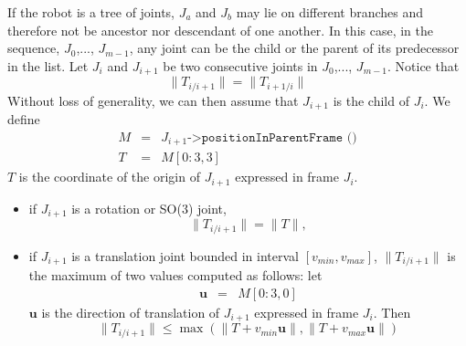 \documentclass {article}
\begin{document}
If the robot is a tree of joints, $J_a$ and $J_b$ may lie on different branches
and therefore not be ancestor nor descendant of one another. In this case, in the sequence, $J_0$,..., $J_{m-1}$, any joint can be the child or the parent of its
predecessor in the list. Let $J_i$ and $J_{i+1}$ be two consecutive joints in $J_0$,..., $J_{m-1}$. Notice that
$$
\|T_{i/i+1}\| = \|T_{i+1/i}\|
$$
Without loss of generality, we can then assume that $J_{i+1}$ is the child of $J_i$. We define
\begin{eqnarray*}
M &=& J_{i+1}\texttt{->positionInParentFrame ()} \\
T &=& M [0:3, 3]
\end{eqnarray*}
$T$ is the coordinate of the origin of $J_{i+1}$ expressed in frame $J_{i}$.
\begin{itemize}
\item if $J_{i+1}$ is a rotation or SO(3) joint,
$$\|T_{i/i+1}\| = \|T\|,$$
\item if $J_{i+1}$ is a translation joint bounded in interval $[v_{min}, v_{max}]$,
$\|T_{i/i+1}\|$ is the maximum of two values computed as follows: let
\begin{eqnarray*}
\mathbf{u} &=& M [0:3, 0]
\end{eqnarray*}
$\mathbf{u}$ is the direction of translation of $J_{i+1}$ expressed in frame
$J_{i}$. Then
$$
\|T_{i/i+1}\| \leq \max (\|T+v_{min}\mathbf{u}\|, \|T+v_{max}\mathbf{u}\|)
$$
\end{itemize}
\end{document}
